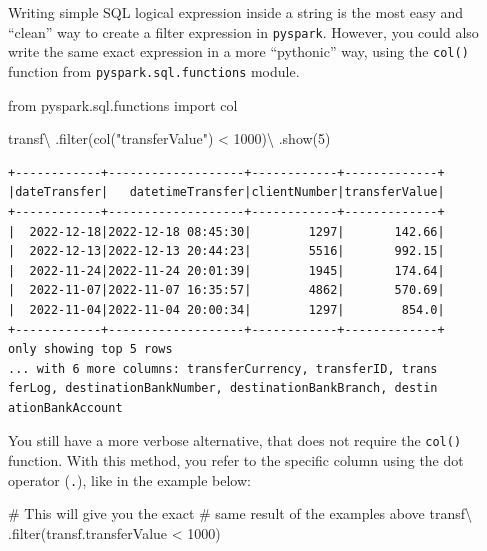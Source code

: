 \documentclass[
  11pt,
  letterpaper,
  DIV=11,
  numbers=noendperiod]{scrreprt}
\newenvironment{Shaded}{\begin{snugshade}}{\end{snugshade}}
\newcommand{\BuiltInTok}[1]{\textcolor[rgb]{0.00,0.23,0.31}{#1}}
\newcommand{\CommentTok}[1]{\textcolor[rgb]{0.37,0.37,0.37}{#1}}
\newcommand{\DecValTok}[1]{\textcolor[rgb]{0.68,0.00,0.00}{#1}}
\newcommand{\ImportTok}[1]{\textcolor[rgb]{0.00,0.46,0.62}{#1}}
\newcommand{\NormalTok}[1]{\textcolor[rgb]{0.00,0.23,0.31}{#1}}
\newcommand{\OperatorTok}[1]{\textcolor[rgb]{0.37,0.37,0.37}{#1}}
\newcommand{\StringTok}[1]{\textcolor[rgb]{0.13,0.47,0.30}{#1}}
\begin{document}
Writing simple SQL logical expression inside a string is the most easy
and ``clean'' way to create a filter expression in \texttt{pyspark}.
However, you could also write the same exact expression in a more
``pythonic'' way, using the \texttt{col()} function from
\texttt{pyspark.sql.functions} module.

\begin{Shaded}
\begin{Highlighting}[]
\ImportTok{from}\NormalTok{ pyspark.sql.functions }\ImportTok{import}\NormalTok{ col}

\NormalTok{transf}\OperatorTok{\textbackslash{}}
\NormalTok{  .}\BuiltInTok{filter}\NormalTok{(col(}\StringTok{"transferValue"}\NormalTok{) }\OperatorTok{\textless{}} \DecValTok{1000}\NormalTok{)}\OperatorTok{\textbackslash{}}
\NormalTok{  .show(}\DecValTok{5}\NormalTok{)}
\end{Highlighting}
\end{Shaded}

\begin{verbatim}
+------------+-------------------+------------+-------------+
|dateTransfer|   datetimeTransfer|clientNumber|transferValue|
+------------+-------------------+------------+-------------+
|  2022-12-18|2022-12-18 08:45:30|        1297|       142.66|
|  2022-12-13|2022-12-13 20:44:23|        5516|       992.15|
|  2022-11-24|2022-11-24 20:01:39|        1945|       174.64|
|  2022-11-07|2022-11-07 16:35:57|        4862|       570.69|
|  2022-11-04|2022-11-04 20:00:34|        1297|        854.0|
+------------+-------------------+------------+-------------+
only showing top 5 rows
... with 6 more columns: transferCurrency, transferID, trans
ferLog, destinationBankNumber, destinationBankBranch, destin
ationBankAccount
\end{verbatim}

You still have a more verbose alternative, that does not require the
\texttt{col()} function. With this method, you refer to the specific
column using the dot operator (\texttt{.}), like in the example below:

\begin{Shaded}
\begin{Highlighting}[]
\CommentTok{\# This will give you the exact}
\CommentTok{\# same result of the examples above}
\NormalTok{transf}\OperatorTok{\textbackslash{}}
\NormalTok{  .}\BuiltInTok{filter}\NormalTok{(transf.transferValue }\OperatorTok{\textless{}} \DecValTok{1000}\NormalTok{)}
\end{Highlighting}
\end{Shaded}
\end{document}
